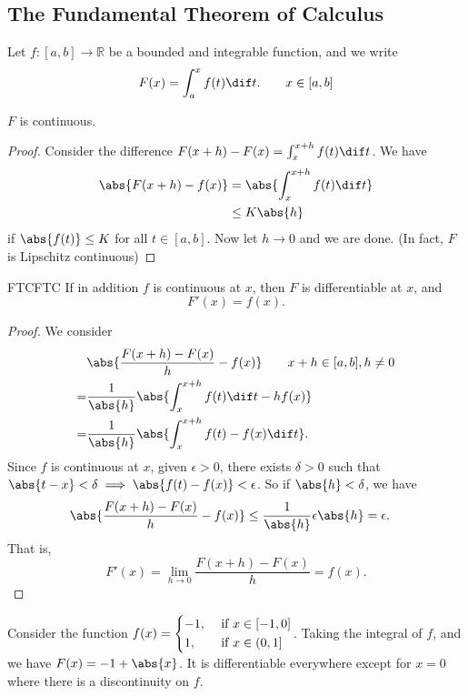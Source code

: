 \subsection{The Fundamental Theorem of Calculus}
Let \(f: [a,b] \to \mathbb{R}\) be a bounded and integrable function, and we write
\[
    F(x) = \int_a^x f(t) \dif t. \qquad x \in [a,b]
\]
\begin{theorem}{}{}
    \(F\) is continuous.
\end{theorem}
\begin{proof}
    Consider the difference \(F(x + h) - F(x) = \int_x^{x+h} f(t) \dif t\). We have
    \begin{align*}
        \abs{F(x + h) - f(x)} &= \abs{\int_x^{x+h}f(t) \dif t}\\
        &\leq K\abs{h}
    \end{align*}
    if \(\abs{f(t)}\leq K\) for all \(t \in [a,b]\). Now let \(h \to 0\) and we are done. (In fact, \(F\) is Lipschitz continuous)
\end{proof}
\begin{theorem}{FTC}{FTC}
    If in addition \(f\) is continuous at \(x\), then \(F\) is differentiable at \(x\), and
    \[
        F'(x) = f(x).
    \]
\end{theorem}
\begin{proof}
    We consider
    \begin{align*}
        &\abs{\frac{F(x + h) - F(x)}{h} - f(x)} \qquad x + h \in [a,b], h \neq 0\\
        =& \frac{1}{\abs{h}}\abs{\int_x^{x+h}f(t) \dif t - hf(x)}\\
        =& \frac{1}{\abs{h}}\abs{\int^{x+h}_x f(t) - f(x) \dif t}.
    \end{align*}
    Since \(f\) is continuous at \(x\), given \(\epsilon>0\), there exists \(\delta>0\) such that \(\abs{t - x}<\delta\implies \abs{f(t) - f(x)}<\epsilon\). So if \(\abs{h}<\delta\), we have
    \begin{align*}
        &\abs{\frac{F(x + h) - F(x)}{h} - f(x)} \leq \frac{1}{\abs{h}}\epsilon\abs{h} = \epsilon.
    \end{align*}
    That is,
    \[
        F'(x) = \lim_{h \to 0} \frac{F(x+h)-F(x)}{h}=f(x).
    \]
\end{proof}
\begin{example}
    Consider the function \(f(x) = \begin{dcases} -1, &\text{ if } x \in [-1,0]\\ 1, &\text{ if } x \in (0,1]\\ \end{dcases}\). Taking the integral of \(f\), and we have \(F(x) = -1 + \abs{x}\). It is differentiable everywhere except for \(x = 0\) where there is a discontinuity on \(f\).
\end{example}
